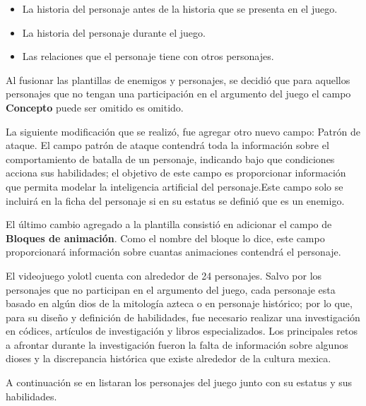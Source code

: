 	\begin{itemize}
		\item La historia del personaje antes de la historia que se presenta en el juego.
		\item La historia del personaje durante el juego. 
		\item Las relaciones que el personaje tiene con otros personajes.
	\end{itemize}

	Al fusionar las plantillas de enemigos y personajes, se decidió que para aquellos personajes que no tengan una participación en el argumento del juego el campo \textbf{Concepto} puede ser omitido es omitido.
	\\
	\par
	La siguiente modificación que se realizó, fue agregar otro nuevo campo: Patrón de ataque. El campo patrón de ataque contendrá toda la información sobre el comportamiento de batalla de un personaje, indicando bajo que condiciones acciona sus habilidades; el objetivo de este campo es proporcionar información que permita modelar la inteligencia artificial del personaje.Este campo	solo se incluirá en la ficha del personaje si en su estatus se definió que es un enemigo. 
	 \\
	 \par
	 El último cambio agregado a la plantilla consistió en adicionar el campo de \textbf{Bloques de animación}. Como el nombre del bloque lo dice, este campo proporcionará información sobre cuantas animaciones contendrá el personaje. 
	\\	 
	\par
	El videojuego yolotl cuenta con alrededor de 24 personajes. Salvo por los personajes que no participan en el argumento del juego, cada personaje esta basado en algún dios de la mitología azteca o en personaje histórico; por lo que, para su diseño y definición de habilidades, fue necesario realizar una investigación en códices, artículos de investigación y libros especializados. Los principales retos a afrontar durante la investigación fueron la falta de información sobre algunos dioses y la discrepancia histórica que existe alrededor de la cultura mexica. 
	\\
	\par
	A continuación se en listaran los personajes del juego junto con su estatus y sus habilidades.
